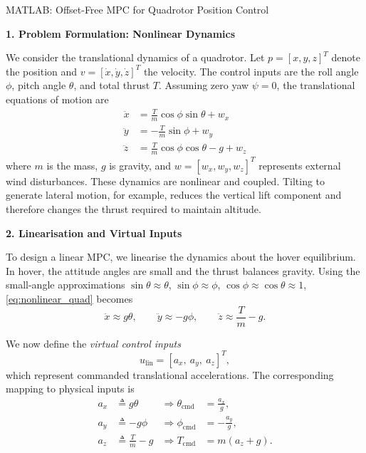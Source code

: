 \begin{examplebox}{MATLAB: Offset-Free MPC for Quadrotor Position Control}
	
	\textbf{1. Problem Formulation: Nonlinear Dynamics}
	
	We consider the translational dynamics of a quadrotor. Let \(p = [x, y, z]^T\) denote the position and \(v = [\dot{x}, \dot{y}, \dot{z}]^T\) the velocity. The control inputs are the roll angle \(\phi\), pitch angle \(\theta\), and total thrust \(T\). Assuming zero yaw \(\psi=0\), the translational equations of motion are
	\begin{align}
		\ddot{x} &= \frac{T}{m}\cos\phi \sin\theta + w_x \nonumber\\
		\ddot{y} &= -\frac{T}{m}\sin\phi + w_y \nonumber\\
		\ddot{z} &= \frac{T}{m}\cos\phi \cos\theta - g + w_z
		\label{eq:nonlinear_quad}
	\end{align}
	where \(m\) is the mass, \(g\) is gravity, and \(w=[w_x,w_y,w_z]^T\) represents external wind disturbances. These dynamics are nonlinear and coupled. Tilting to generate lateral motion, for example, reduces the vertical lift component and therefore changes the thrust required to maintain altitude.
	
	\textbf{2. Linearisation and Virtual Inputs}
	
	To design a linear MPC, we linearise the dynamics about the hover equilibrium. In hover, the attitude angles are small and the thrust balances gravity. Using the small-angle approximations \(\sin\theta \approx \theta\), \(\sin\phi \approx \phi\), \(\cos\phi \approx \cos\theta \approx 1\), \eqref{eq:nonlinear_quad} becomes
	\[
	\ddot{x} \approx g\theta, \qquad
	\ddot{y} \approx -g\phi, \qquad
	\ddot{z} \approx \frac{T}{m} - g.
	\]
	
	We now define the \emph{virtual control inputs}
	\[
	u_{\mathrm{lin}} = [a_x,\ a_y,\ a_z]^T,
	\]
	which represent commanded translational accelerations. The corresponding mapping to physical inputs is
	\begin{equation} \label{eq:virtual_mapping}
		\begin{aligned}
			a_x &\triangleq g\theta & \Rightarrow \theta_{\mathrm{cmd}} &= \frac{a_x}{g},\\
			a_y &\triangleq -g\phi & \Rightarrow \phi_{\mathrm{cmd}} &= -\frac{a_y}{g},\\
			a_z &\triangleq \frac{T}{m} - g & \Rightarrow T_{\mathrm{cmd}} &= m(a_z + g).
		\end{aligned}
	\end{equation}
	

\end{examplebox}
